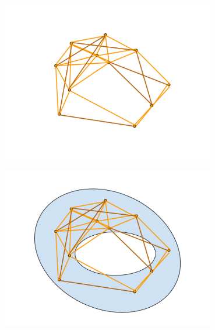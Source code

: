 \documentclass{beamer}
\begin{document}
\begin{frame}
  \begin{center}
    \includegraphics[height=7cm]{images/data_nosource_4}
  \end{center}
\end{frame}
\begin{frame}
  \begin{center}
    \includegraphics[height=7cm]{images/data_source_4}
  \end{center}
\end{frame}
\end{document}
